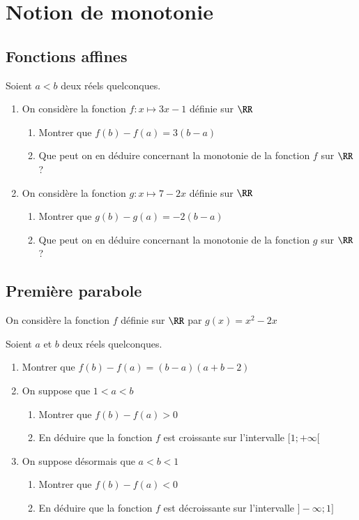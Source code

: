 \documentclass[oneside,12pt]{article}          %
\begin{document}
\section{Notion de monotonie}

\subsection{Fonctions affines}
Soient $a<b$ deux réels quelconques.
\begin{enumerate}
	\item On considère la fonction $f:x\mapsto 3x-1$ définie sur $\RR$ 
	\begin{enumerate}
		\item Montrer que $f(b)-f(a)=3(b-a)$
		\item Que peut on en déduire concernant la monotonie de la fonction $f$ sur $\RR$ ?
	\end{enumerate}
	\item On considère la fonction $g:x\mapsto 7-2x$ définie sur $\RR$ 
	\begin{enumerate}
		\item Montrer que $g(b)-g(a)=-2(b-a)$
		\item Que peut on en déduire concernant la monotonie de la fonction $g$ sur $\RR$ ?
	\end{enumerate}
\end{enumerate}



\subsection{Première parabole}
On considère la fonction $f$ définie sur $\RR$ par $g(x)=x^2-2x$

Soient $a$ et $b$ deux réels quelconques.
\begin{enumerate}
	\item Montrer que $f(b)-f(a)=(b-a)(a+b-2)$
	\item On suppose que $1<a<b$
	
	\begin{enumerate}
		\item Montrer que $f(b)-f(a)>0$
		\item En déduire que la fonction $f$ est croissante sur l'intervalle $[1;+\infty[$
	\end{enumerate}
	\item On suppose désormais que $a<b<1$
	\begin{enumerate}
		\item Montrer que $f(b)-f(a)<0$
		\item En déduire que la fonction $f$ est décroissante sur l'intervalle $]-\infty;1]$
	\end{enumerate}
\end{enumerate}
\end{document}
